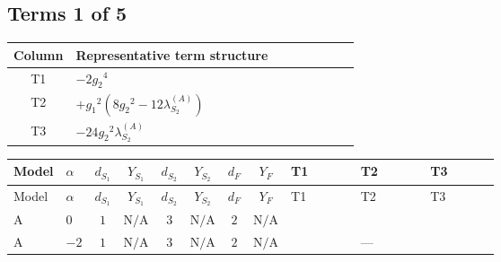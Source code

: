 \documentclass[8pt]{article}
\begin{document}
\begin{landscape}
\subsection*{Terms 1 of 5}
\begin{center}
\begin{tabular}{@{}c >{\raggedright\arraybackslash}p{0.82\linewidth}@{}}
\toprule
Column & Representative term structure \\
\midrule
T1 & \(\displaystyle -2 {g_2}^4\) \\
\midrule
T2 & \(\displaystyle +{g_1}^2 \left(8 {g_2}^2-12 {\lambda_{S_2}^{(A)}}\right)\) \\
\midrule
T3 & \(\displaystyle -24 {g_2}^2 {\lambda_{S_2}^{(A)}}\) \\
\midrule
\bottomrule
\end{tabular}
\end{center}
\smallskip
\tiny
\begin{longtable}{@{}llcccccc >{\raggedright\arraybackslash}p{0.21\linewidth} >{\raggedright\arraybackslash}p{0.21\linewidth} >{\raggedright\arraybackslash}p{0.21\linewidth}@{}}
\toprule
Model & $\alpha$ & $d_{S_1}$ & $Y_{S_1}$ & $d_{S_2}$ & $Y_{S_2}$ & $d_F$ & $Y_F$ & T1 & T2 & T3 \\
\midrule
\endfirsthead
\toprule
Model & $\alpha$ & $d_{S_1}$ & $Y_{S_1}$ & $d_{S_2}$ & $Y_{S_2}$ & $d_F$ & $Y_F$ & T1 & T2 & T3 \\
\midrule
\endhead
A & $0$ & $1$ & $\text{N/A}$ & $3$ & $\text{N/A}$ & $2$ & $\text{N/A}$ & \scriptsize\adjustbox{max width=\linewidth}{$\begin{gathered} -2 {g_2}^4\end{gathered}$} & \scriptsize\adjustbox{max width=\linewidth}{$\begin{gathered} +{g_1}^2 \left(8 {g_2}^2-12 {\lambda_{S_2}^{(A)}}\right)\end{gathered}$} & \scriptsize\adjustbox{max width=\linewidth}{$\begin{gathered} -24 {g_2}^2 {\lambda_{S_2}^{(A)}}\end{gathered}$} \\
\midrule
A & $-2$ & $1$ & $\text{N/A}$ & $3$ & $\text{N/A}$ & $2$ & $\text{N/A}$ & \scriptsize\adjustbox{max width=\linewidth}{$\begin{gathered} -2 {g_2}^4\end{gathered}$} & --- & \scriptsize\adjustbox{max width=\linewidth}{$\begin{gathered} -24 {g_2}^2 {\lambda_{S_2}^{(A)}}\end{gathered}$} \\

\end{longtable}
\end{landscape}
\end{document}
